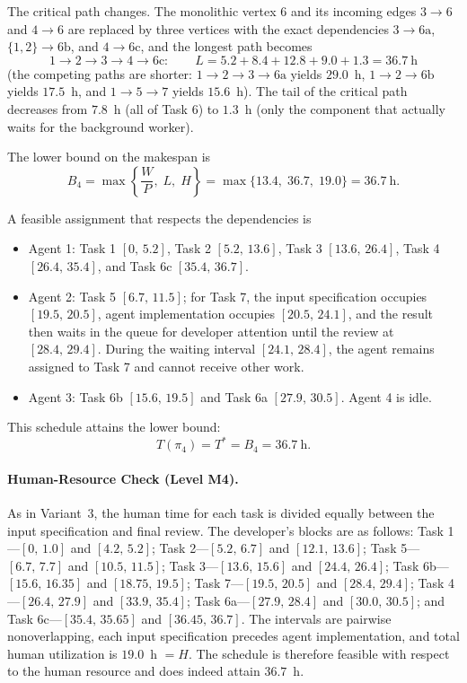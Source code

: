 The critical path changes. The monolithic vertex 6 and its incoming edges
$3 \to 6$ and $4 \to 6$ are replaced by three vertices with the exact
dependencies $3 \to 6\text{a}$, $\{1,2\} \to 6\text{b}$, and
$4 \to 6\text{c}$, and the longest path becomes
\[
  1 \to 2 \to 3 \to 4 \to 6\text{c}: \qquad
  L = 5.2 + 8.4 + 12.8 + 9.0 + 1.3 = 36.7~\text{h}
\]
(the competing paths are shorter: $1 \to 2 \to 3 \to 6\text{a}$ yields
$29.0$~h, $1 \to 2 \to 6\text{b}$ yields $17.5$~h, and
$1 \to 5 \to 7$ yields $15.6$~h). The tail of the critical path decreases
from $7.8$~h (all of Task 6) to $1.3$~h (only the component that actually waits
for the background worker).

The lower bound on the makespan is
\[
  B_4 = \max\left\{\frac{W}{P},\; L,\; H\right\} = \max\{13.4,\; 36.7,\; 19.0\} = 36.7~\text{h}.
\]

A feasible assignment that respects the dependencies is
\begin{itemize}
  \item Agent 1: Task 1 $[0,\,5.2]$, Task 2 $[5.2,\,13.6]$, Task 3
  $[13.6,\,26.4]$, Task 4 $[26.4,\,35.4]$, and Task 6c
  $[35.4,\,36.7]$.
  \item Agent 2: Task 5 $[6.7,\,11.5]$; for Task 7, the input specification
  occupies $[19.5,\,20.5]$, agent implementation occupies
  $[20.5,\,24.1]$, and the result then waits in the queue for developer
  attention until the review at $[28.4,\,29.4]$. During the waiting interval
  $[24.1,\,28.4]$, the agent remains assigned to Task 7 and cannot receive
  other work.
  \item Agent 3: Task 6b $[15.6,\,19.5]$ and Task 6a
  $[27.9,\,30.5]$. Agent 4 is idle.
\end{itemize}

This schedule attains the lower bound:
\[
  T(\pi_4)=T^{*}=B_4=36.7~\text{h}.
\]

\paragraph{Human-Resource Check (Level M4).}
As in Variant~3, the human time for each task is divided equally between the
input specification and final review. The developer's blocks are as follows:
Task 1---$[0,\,1.0]$ and $[4.2,\,5.2]$; Task 2---$[5.2,\,6.7]$ and
$[12.1,\,13.6]$; Task 5---$[6.7,\,7.7]$ and $[10.5,\,11.5]$; Task
3---$[13.6,\,15.6]$ and $[24.4,\,26.4]$; Task 6b---$[15.6,\,16.35]$
and $[18.75,\,19.5]$; Task 7---$[19.5,\,20.5]$ and $[28.4,\,29.4]$;
Task 4---$[26.4,\,27.9]$ and $[33.9,\,35.4]$; Task
6a---$[27.9,\,28.4]$ and $[30.0,\,30.5]$; and Task
6c---$[35.4,\,35.65]$ and $[36.45,\,36.7]$. The intervals are pairwise
nonoverlapping, each input specification precedes agent implementation, and
total human utilization is $19.0$~h $= H$. The schedule is therefore feasible
with respect to the human resource and does indeed attain $36.7$~h.

